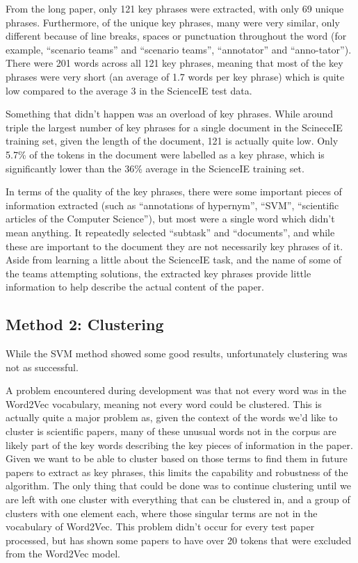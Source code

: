 From the long paper, only 121 key phrases were extracted, with only 69 unique phrases. Furthermore, of the unique key phrases, many were very similar, only different because of line breaks, spaces or punctuation throughout the word (for example, ``scenario  teams'' and ``scenario teams'', ``annotator'' and ``anno-tator''). There were 201 words across all 121 key phrases, meaning that most of the key phrases were very short (an average of 1.7 words per key phrase) which is quite low compared to the average 3 in the ScienceIE test data. 

Something that didn't happen was an overload of key phrases. While around triple the largest number of key phrases for a single document in the ScineceIE training set, given the length of the document, 121 is actually quite low. Only 5.7\% of the tokens in the document were labelled as a key phrase, which is significantly lower than the 36\% average in the ScienceIE training set.

In terms of the quality of the key phrases, there were some important pieces of information extracted (such as ``annotations of hypernym'', ``SVM'', ``scientific articles of the Computer Science''), but most were a single word which didn't mean anything. It repeatedly selected ``subtask'' and ``documents'', and while these are important to the document they are not necessarily key phrases of it. Aside from learning a little about the ScienceIE task, and the name of some of the teams attempting solutions, the extracted key phrases provide little information to help describe the actual content of the paper.

\subsection{Method 2: Clustering}
While the SVM method showed some good results, unfortunately clustering was not as successful. 

A problem encountered during development was that not every word was in the Word2Vec vocabulary, meaning not every word could be clustered. This is actually quite a major problem as, given the context of the words we'd like to cluster is scientific papers, many of these unusual words not in the corpus are likely part of the key words describing the key pieces of information in the paper. Given we want to be able to cluster based on those terms to find them in future papers to extract as key phrases, this limits the capability and robustness of the algorithm. The only thing that could be done was to continue clustering until we are left with one cluster with everything that can be clustered in, and a group of clusters with one element each, where those singular terms are not in the vocabulary of Word2Vec. This problem didn't occur for every test paper processed, but has shown some papers to have over 20 tokens that were excluded from the Word2Vec model. 


